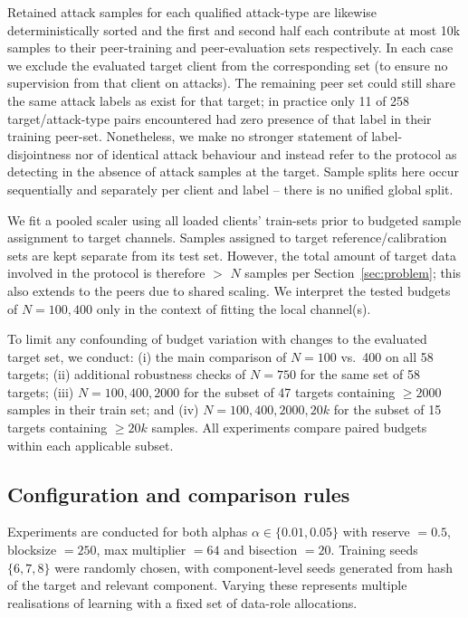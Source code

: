Retained attack samples for each qualified attack-type are likewise deterministically sorted and the first and second half each contribute at most 10k samples to their peer-training and peer-evaluation sets respectively. In each case we exclude the evaluated target client from the corresponding set (to ensure no supervision from that client on attacks). The remaining peer set could still share the same attack labels as exist for that target; in practice only 11 of 258 target/attack-type pairs encountered had zero presence of that label in their training peer-set. Nonetheless, we make no stronger statement of label-disjointness nor of identical attack behaviour and instead refer to the protocol as detecting in the absence of attack samples at the target. Sample splits here occur sequentially and separately per client and label -- there is no unified global split.

We fit a pooled scaler using all loaded clients' train-sets prior to budgeted sample assignment to target channels. Samples assigned to target reference/calibration sets are kept separate from its test set. However, the total amount of target data involved in the protocol is therefore $>$ $N$ samples per Section~\ref{sec:problem}; this also extends to the peers due to shared scaling. We interpret the tested budgets of $N=100,400$ only in the context of fitting the local channel(s).

To limit any confounding of budget variation with changes to the evaluated target set, we conduct:
(i) the main comparison of $N=100$ vs.\ 400 on all 58 targets;
(ii) additional robustness checks of $N=750$ for the same set of 58 targets;
(iii) $N=100,400,2000$ for the subset of 47 targets containing $\geq 2000$ samples in their train set; and
(iv) $N=100,400,2000,20k$ for the subset of 15 targets containing $\geq 20k$ samples. All experiments compare paired budgets within each applicable subset.

\subsection{Configuration and comparison rules} 
Experiments are conducted for both alphas $\alpha \in \{0.01, 0.05\}$ with reserve $=0.5$, blocksize $=250$, max multiplier $= 64$ and bisection $= 20$. Training seeds $\{6,7,8\}$ were randomly chosen, with component-level seeds generated from hash of the target and relevant component. Varying these represents multiple realisations of learning with a fixed set of data-role allocations.

